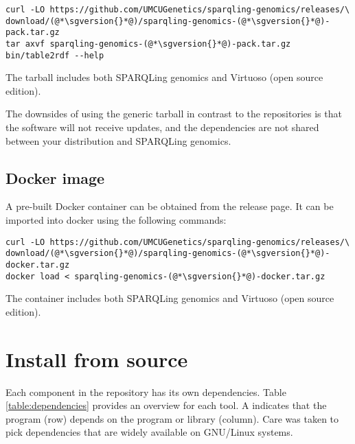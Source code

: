 \begin{lstlisting}
curl -LO https://github.com/UMCUGenetics/sparqling-genomics/releases/\
download/(@*\sgversion{}*@)/sparqling-genomics-(@*\sgversion{}*@)-pack.tar.gz
tar axvf sparqling-genomics-(@*\sgversion{}*@)-pack.tar.gz
bin/table2rdf --help
\end{lstlisting}

  The tarball includes both SPARQLing genomics and Virtuoso (open source
  edition).

  The downsides of using the generic tarball in contrast to the repositories is
  that the software will not receive updates, and the dependencies are not
  shared between your distribution and SPARQLing genomics.

\subsection{Docker image}

  A pre-built Docker container can be obtained from the release page.  It
  can be imported into docker using the following commands:

\begin{lstlisting}
curl -LO https://github.com/UMCUGenetics/sparqling-genomics/releases/\
download/(@*\sgversion{}*@)/sparqling-genomics-(@*\sgversion{}*@)-docker.tar.gz
docker load < sparqling-genomics-(@*\sgversion{}*@)-docker.tar.gz
\end{lstlisting}

  The container includes both SPARQLing genomics and Virtuoso (open source
  edition).

\section{Install from source}
\label{sec:source-installation}

  Each component in the repository has its own dependencies.  Table
  \ref{table:dependencies} provides an overview for each tool.  A \B{}
  indicates that the program (row) depends on the program or library (column).
  Care was taken to pick dependencies that are widely available on GNU/Linux
  systems.

